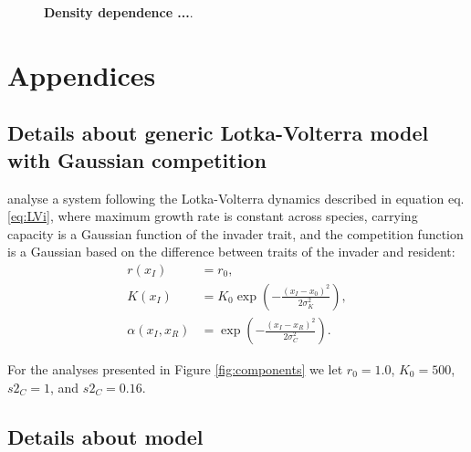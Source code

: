 \documentclass[a4paper,11pt]{article}
\begin{document}
\begin{figure}[h]
  \centering
  \caption{\textbf{Density dependence
  ...}.
  \label{fig:dd}}
\end{figure}

\clearpage




\section{Appendices}

\subsection{Details about generic Lotka-Volterra model with
Gaussian competition}\label{sec:DD99}

\citet{Dieckmann-1999} analyse a system following the Lotka-Volterra dynamics
described in equation eq. \ref{eq:LVi}, where maximum growth rate is constant
across species, carrying capacity is a Gaussian
function of the invader trait, and the competition function is a Gaussian
based on the difference between traits of the invader and resident:
\begin{subequations}
\begin{align}
\label{eq:DD}
r(x_I) &= r_0, \\
K(x_I) &= K_0 \exp\left(-\frac{\left(x_I-x_0\right)^2}{2\sigma^2_K}\right),\\
\alpha(x_I, x_R) &= \exp\left(-\frac{\left(x_I-x_R\right)^2}{2\sigma^2_C}\right).
\end{align}
\end{subequations}

For the analyses presented in Figure \ref{fig:components} we let $r_0=1.0$, $K_0=500$,
 $s2_C=1$, and $s2_C=0.16$.

\subsection{Details about \Rstar model}\label{sec:Rstar}
\end{document}
